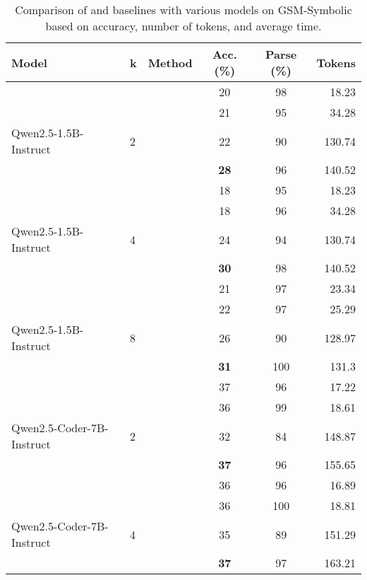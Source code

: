 \begin{table*}[t]
    \centering
    \caption{Comparison of \Tool{} and baselines with various models on GSM-Symbolic based on accuracy, number of tokens, and average time.}
    \begin{tabular}{llcccr}
        \toprule
        \textbf{Model} & \textbf{k} & \textbf{Method} & \textbf{Acc. (\%)} & \textbf{Parse (\%)} &  \textbf{Tokens}\\
        
\midrule

   &  & \stdUnconstrained{} & 20 & 98 & 18.23 \\
 & & \stdConstrained{} & 21 & 95 & 34.28 \\
 Qwen2.5-1.5B-Instruct & 2 & \cotUnconstrained{} & 22 & 90 & 130.74 \\
 & & \textbf{\Tool{}} & \textbf{28} & 96 & 140.52 \\

\midrule

   &  & \stdUnconstrained{} & 18 & 95 & 18.23 \\
 & & \stdConstrained{} & 18 & 96 & 34.28 \\
 Qwen2.5-1.5B-Instruct & 4 & \cotUnconstrained{} & 24 & 94 & 130.74 \\
 & & \textbf{\Tool{}} & \textbf{30} & 98 & 140.52 \\

\midrule
   &  & \stdUnconstrained{} & 21 & 97 & 23.34  \\
 & & \stdConstrained{} & 22 & 97 & 25.29  \\
  Qwen2.5-1.5B-Instruct  & 8 & \cotUnconstrained{} & 26 & 90 & 128.97  \\
 & & \textbf{\Tool{}} & \textbf{31} & 100 & 131.3  \\

\midrule

    & & \stdUnconstrained{} & 37 & 96 & 17.22 \\
 & & \stdConstrained{} & 36 & 99 & 18.61  \\
 Qwen2.5-Coder-7B-Instruct & 2 & \cotUnconstrained{} & 32 & 84 & 148.87 \\
 & & \textbf{\Tool{}} & \textbf{37} & 96 & 155.65\\

\midrule

    & & \stdUnconstrained{} & 36 & 96 & 16.89 \\
 & & \stdConstrained{} & 36 & 100 & 18.81  \\
 Qwen2.5-Coder-7B-Instruct & 4 & \cotUnconstrained{} & 35 & 89 & 151.29 \\
 & & \textbf{\Tool{}} & \textbf{37} & 97 & 163.21\\


\end{tabular}
\end{table*}
